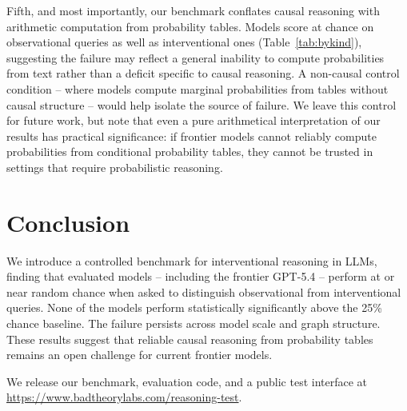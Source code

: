 \documentclass[11pt,a4paper]{article}
\begin{document}
Fifth, and most importantly, our benchmark conflates causal reasoning with arithmetic computation from probability tables. Models score at chance on observational queries as well as interventional ones (Table~\ref{tab:bykind}), suggesting the failure may reflect a general inability to compute probabilities from text rather than a deficit specific to causal reasoning. A non-causal control condition -- where models compute marginal probabilities from tables without causal structure -- would help isolate the source of failure. We leave this control for future work, but note that even a pure arithmetical interpretation of our results has practical significance: if frontier models cannot reliably compute probabilities from conditional probability tables, they cannot be trusted in settings that require probabilistic reasoning.

\section{Conclusion}

We introduce a controlled benchmark for interventional reasoning in LLMs, finding that evaluated models -- including the frontier GPT-5.4 -- perform at or near random chance when asked to distinguish observational from interventional queries. None of the models perform statistically significantly above the 25\% chance baseline. The failure persists across model scale and graph structure. These results suggest that reliable causal reasoning from probability tables remains an open challenge for current frontier models.

We release our benchmark, evaluation code, and a public test interface at \url{https://www.badtheorylabs.com/reasoning-test}.
\end{document}
